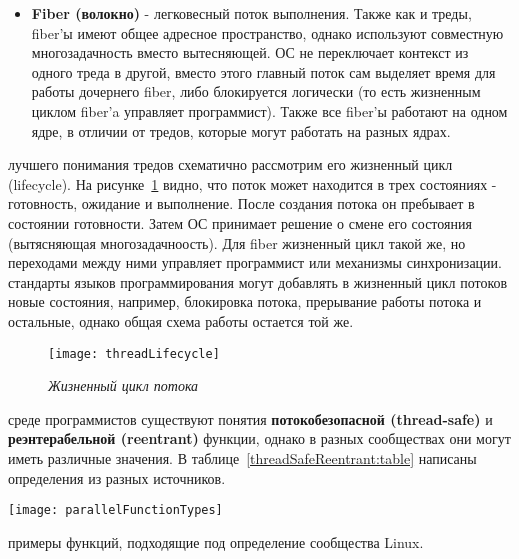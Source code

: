 {\begin{itemize}
			\item\textbf{Fiber (волокно)} - легковесный поток выполнения. Также как и треды, fiber'ы имеют общее адресное пространство, однако используют совместную многозадачность вместо вытесняющей. ОС не переключает контекст из одного треда в другой, вместо этого главный поток сам выделяет время для работы дочернего fiber, либо блокируется логически (то есть жизненным циклом fiber'a управляет программист). Также все fiber'ы работают на одном ядре, в отличии от тредов, которые могут работать на разных ядрах.
		\end{itemize}
	 лучшего понимания тредов схематично рассмотрим его жизненный цикл (lifecycle). На рисунке~\ref{threadLifecycle:image} видно, что поток может находится в трех состояниях - готовность, ожидание и выполнение. После создания потока он пребывает в состоянии готовности. Затем ОС принимает решение о смене его состояния (вытясняющая многозадачноость). Для fiber жизненный цикл такой же, но переходами между ними управляет программист или механизмы синхронизации.
	 стандарты языков программирования могут добавлять в жизненный цикл потоков новые состояния, например, блокировка потока, прерывание работы потока и остальные, однако общая схема работы остается той же.
		\begin{figure}[H]
			\texttt{[image: threadLifecycle]}
			\caption{\textit{Жизненный цикл потока}}
			\label{threadLifecycle:image}
		\end{figure}
	 среде программистов существуют понятия \textbf{потокобезопасной (thread-safe)} и \textbf{реэнтерабельной (reentrant)} функции, однако в разных сообществах они могут иметь различные значения. В таблице~\ref{threadSafeReentrant:table} написаны определения из разных источников.
	\begin{table}[H]
		\caption{Определения thread-safe и reentrant функций}
		\label{threadSafeReentrant:table}
		\begin{center}
					\texttt{[image: parallelFunctionTypes]}
		\end{center}
	\end{table}
	 примеры функций, подходящие под определение сообщества Linux.
	\begin{figure}[H]
		

\end{figure}}
